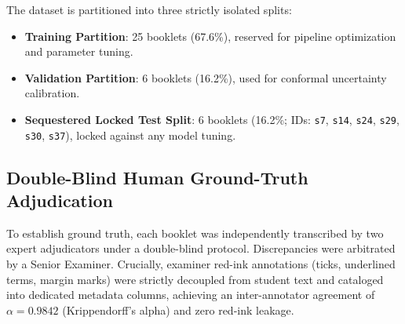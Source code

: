 \documentclass[journal]{IEEEtran}
\begin{document}
The dataset is partitioned into three strictly isolated splits:
\begin{itemize}
    \item \textbf{Training Partition}: 25 booklets (67.6\%), reserved for pipeline optimization and parameter tuning.
    \item \textbf{Validation Partition}: 6 booklets (16.2\%), used for conformal uncertainty calibration.
    \item \textbf{Sequestered Locked Test Split}: 6 booklets (16.2\%; IDs: \texttt{s7}, \texttt{s14}, \texttt{s24}, \texttt{s29}, \texttt{s30}, \texttt{s37}), locked against any model tuning.
\end{itemize}

\subsection{Double-Blind Human Ground-Truth Adjudication}
To establish ground truth, each booklet was independently transcribed by two expert adjudicators under a double-blind protocol. Discrepancies were arbitrated by a Senior Examiner. Crucially, examiner red-ink annotations (ticks, underlined terms, margin marks) were strictly decoupled from student text and cataloged into dedicated metadata columns, achieving an inter-annotator agreement of $\alpha = 0.9842$ (Krippendorff's alpha) and zero red-ink leakage.
\end{document}
